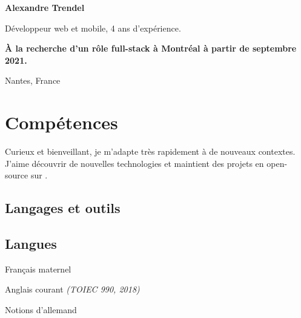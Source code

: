 \documentclass{cv}
\begin{document}
\pagestyle{empty}

\noindent\begin{minipage}[t]{0.5\textwidth}
	\noindent\textbf{\color{solviolet} \LARGE Alexandre Trendel}\medskip

	Développeur web et mobile, 4 ans d'expérience. \smallskip
	
	\textbf{À la recherche d'un rôle full-stack à Montréal à partir de septembre 2021.}	

	\smallskip\noindent{\color{solviolet}\rule{3cm}{1.5pt}}

\end{minipage}\hfill%
\begin{minipage}[t]{0.3\textwidth}
	 Nantes, France
	\newline{} %
	\newline{} \href{mailto:%
	}{\link{%
	}}%
	\newline{} \href{https://github.com/xou816}{} 
	
\end{minipage}


\section{Compétences}

Curieux et bienveillant, je m'adapte très rapidement à de nouveaux contextes. J'aime découvrir de nouvelles technologies et maintient des projets en open-source sur \href{https://github.com/xou816}{}.

\noindent%
\begin{minipage}[t]{0.40\textwidth}

	\subsection{Langages et outils}
	\begin{center}
		   
		  
		 
		  
	\end{center}

\end{minipage}\hfill%
\begin{minipage}[t]{0.45\textwidth}
	\subsection{Langues}
	Français maternel
	
	Anglais courant {\itshape (TOIEC 990, 2018)}
	
	Notions d'allemand
\end{minipage}
\end{document}
